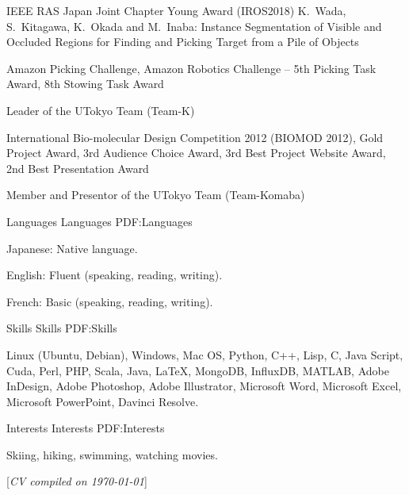 \documentclass[letterpaper,MMMyyyy,nonstopmode]{simpleresumecv}
\newcommand{\CVNote}{CV compiled on {\today}}
\begin{document}
\begin{Body}
 IEEE RAS Japan Joint Chapter Young Award (IROS2018)
\hfill
{}
\newline
K.~Wada, S.~Kitagawa, K.~Okada and M.~Inaba: Instance Segmentation of Visible and
Occluded Regions for Finding and Picking Target from a Pile of Objects

\BulletItem
Amazon Picking Challenge, Amazon Robotics Challenge
\hfill
{} --
\newline
5th Picking Task Award, 8th Stowing Task Award
\begin{Detail}
\Item
Leader of the UTokyo Team (Team-K)
\end{Detail}

\BulletItem
International Bio-molecular Design Competition 2012 (BIOMOD 2012),
\hfill
{}
\newline
Gold Project Award, 3rd Audience Choice Award, 3rd Best Project Website Award, 2nd Best Presentation Award
\begin{Detail}
\Item
Member and Presentor of the UTokyo Team (Team-Komaba)
\end{Detail}

\Gap


\Section
{Languages}
{Languages}
{PDF:Languages}

\BulletItem
Japanese: Native language.

\Gap
\BulletItem
English: Fluent (speaking, reading, writing).

\Gap
\BulletItem
French: Basic (speaking, reading, writing).


\Section
{Skills}
{Skills}
{PDF:Skills}

\Entry
Linux (Ubuntu, Debian),
Windows,
Mac OS,
Python,
C++,
Lisp,
C,
Java Script,
Cuda,
Perl,
PHP,
Scala,
Java,
{\LaTeX},
MongoDB,
InfluxDB,
MATLAB,
Adobe InDesign,
Adobe Photoshop,
Adobe Illustrator,
Microsoft Word,
Microsoft Excel,
Microsoft PowerPoint,
Davinci Resolve.


\Section
{Interests}
{Interests}
{PDF:Interests}

\Entry
Skiing,
hiking,
swimming,
watching movies.

\end{Body}


\BigGap
\UseNoteFont%
\null\hfill%
[\textit{\CVNote}]
\end{document}
